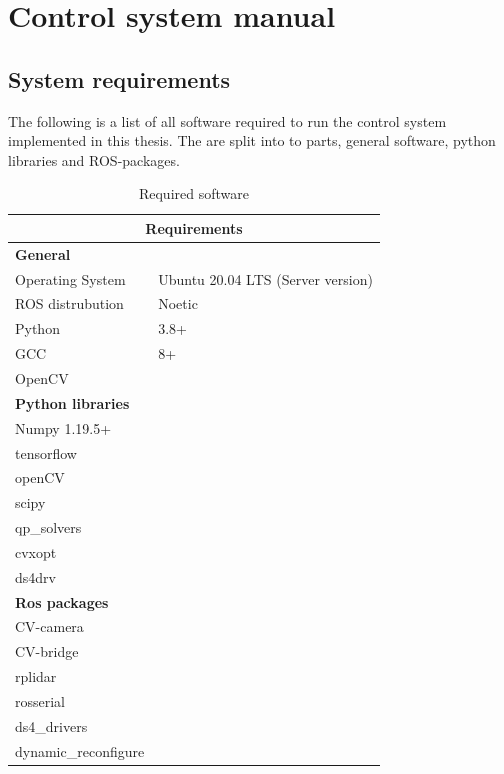 \chapter{Control system manual}

\section{System requirements}

The following is a list of all software required to run the control system implemented in this thesis. The are split into to parts, general software, python libraries and ROS-packages.

\begin{table}[H]
    \centering
    \begin{tabular*}{\linewidth}{ll}
    \toprule
    \multicolumn{2}{c}{\Large \textbf{\quad \quad \quad Requirements}} \\
    \midrule
    \multicolumn{2}{l}{\large \textbf{General}} \\
    \midrule
    Operating System & Ubuntu 20.04 LTS (Server version) \\
    ROS distrubution & Noetic \\ 
    Python &  3.8+ \\
    GCC & 8+ \\
    OpenCV & \\
    \midrule
    \multicolumn{2}{l}{\large \textbf{Python libraries}} \\
    \midrule
    Numpy 1.19.5+ & \\
    tensorflow & \\
    openCV & \\
    scipy & \\
    qp\_solvers & \\
    cvxopt & \\
    ds4drv & \\
    \midrule
    \multicolumn{2}{l}{\large \textbf{Ros packages}} \\
    \midrule
    CV-camera & \\
    CV-bridge & \\
    rplidar & \\
    rosserial & \\
    ds4\_drivers & \\
    dynamic\_reconfigure & \\
    \bottomrule
    \end{tabular*}
    \caption{Required software}
    \label{tab:requiredsoftware}
\end{table}

